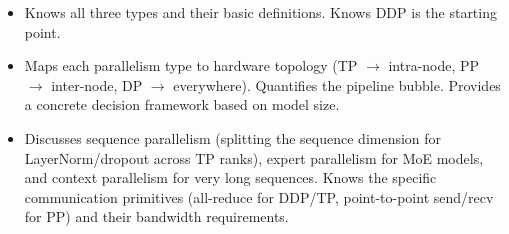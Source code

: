 \begin{interviewq}
\goodgreat
\begin{itemize}
    \item {} Knows all three types and their basic definitions. Knows DDP is the starting point.
    \item {} Maps each parallelism type to hardware topology (TP $\to$ intra-node, PP $\to$ inter-node, DP $\to$ everywhere). Quantifies the pipeline bubble. Provides a concrete decision framework based on model size.
    \item {} Discusses sequence parallelism (splitting the sequence dimension for LayerNorm/dropout across TP ranks), expert parallelism for MoE models, and context parallelism for very long sequences. Knows the specific communication primitives (all-reduce for DDP/TP, point-to-point send/recv for PP) and their bandwidth requirements.
\end{itemize}

\end{interviewq}

